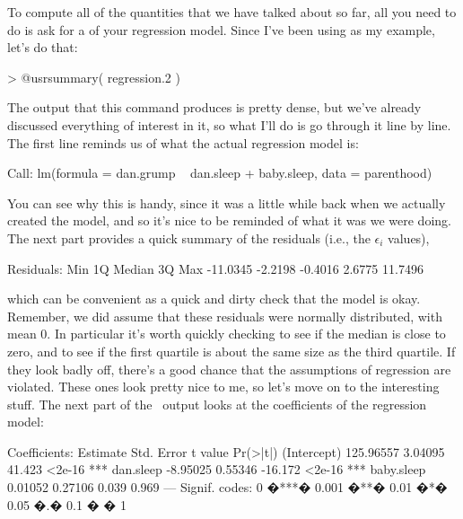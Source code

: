
To compute all of the quantities that we have talked about so far, all you need to do is ask for a  of your regression model. Since I've been using  as my example, let's do that:
\begin{rblock1}
> @usr{summary( regression.2 )}
\end{rblock1}
The output that this command produces is pretty dense, but we've already discussed everything of interest in it, so what I'll do is go through it line by line. The first line reminds us of what the actual regression model is:
\begin{rblock}
Call:
lm(formula = dan.grump ~ dan.sleep + baby.sleep, data = parenthood)
\end{rblock}
You can see why this is handy, since it was a little while back when we actually created the  model, and so it's nice to be reminded of what it was we were doing. The next part provides a quick summary of the residuals (i.e., the $\epsilon_i$ values), 
\begin{rblock}
Residuals:
     Min       1Q   Median       3Q      Max 
-11.0345  -2.2198  -0.4016   2.6775  11.7496 
\end{rblock}
which can be convenient as a quick and dirty check that the model is okay. Remember, we did assume that these residuals were normally distributed, with mean 0. In particular it's worth quickly checking to see if the median is close to zero, and to see if the first quartile is about the same size as the third quartile. If they look badly off, there's a good chance that the assumptions of regression are violated. These ones look pretty nice to me, so let's move on to the interesting stuff. The next part of the \R\ output looks at the coefficients of the regression model:
\begin{rblock}
Coefficients:
             Estimate Std. Error t value Pr(>|t|)    
(Intercept) 125.96557    3.04095  41.423   <2e-16 ***
dan.sleep    -8.95025    0.55346 -16.172   <2e-16 ***
baby.sleep    0.01052    0.27106   0.039    0.969 
---
Signif. codes:  0 �***� 0.001 �**� 0.01 �*� 0.05 �.� 0.1 � � 1 
\end{rblock}
